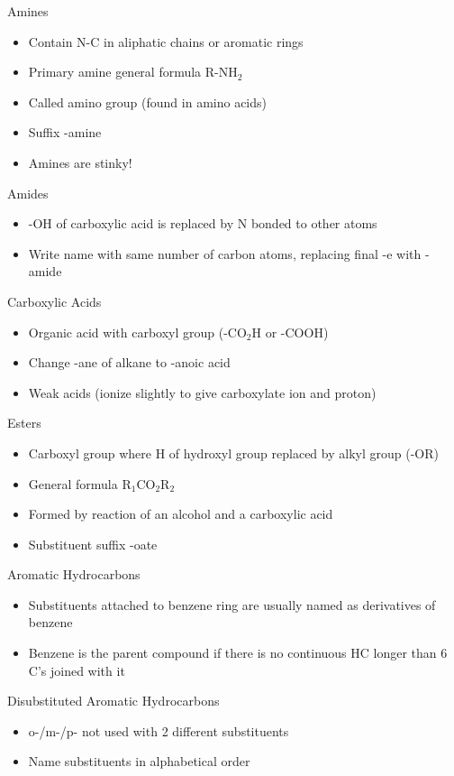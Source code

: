 \documentclass[../hchem.tex]{subfiles}
\begin{document}
Amines 
\begin{itemize}
    \item Contain N-C in aliphatic chains or aromatic rings 
    \item Primary amine general formula R-NH$_2$
    \item Called amino group (found in amino acids)
    \item Suffix -amine 
    \item Amines are stinky!
\end{itemize}

Amides 
\begin{itemize}
    \item -OH of carboxylic acid is replaced by N bonded to other atoms 
    \item Write name with same number of carbon atoms, replacing final -e with -amide 
\end{itemize}

Carboxylic Acids 
\begin{itemize}
    \item Organic acid with carboxyl group (-CO$_2$H or -COOH)
    \item Change -ane of alkane to -anoic acid 
    \item Weak acids (ionize slightly to give carboxylate ion and proton)
\end{itemize}

Esters 
\begin{itemize}
    \item Carboxyl group where H of hydroxyl group replaced by alkyl group (-OR)
    \item General formula R$_1$CO$_2$R$_2$
    \item Formed by reaction of an alcohol and a carboxylic acid 
    \item Substituent suffix -oate 
\end{itemize}

Aromatic Hydrocarbons 
\begin{itemize}
    \item Substituents attached to benzene ring are usually named as derivatives of benzene 
    \item Benzene is the parent compound if there is no continuous HC longer than 6 C's joined with it 
\end{itemize}

Disubstituted Aromatic Hydrocarbons
\begin{itemize}
    \item o-/m-/p- not used with 2 different substituents 
    \item Name substituents in alphabetical order 
\end{itemize}
\end{document}
